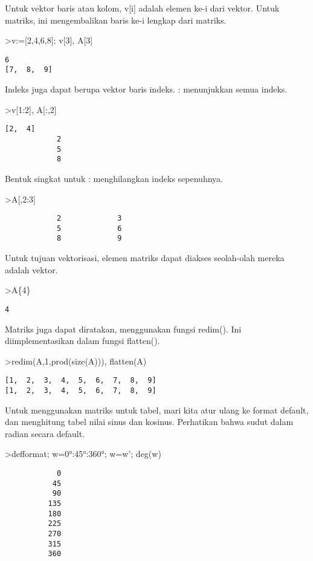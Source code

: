 \documentclass[
]{book}
\begin{document}
Untuk vektor baris atau kolom, v{[}i{]} adalah elemen ke-i dari vektor. Untuk matriks, ini mengembalikan baris ke-i lengkap dari matriks.

\textgreater v:={[}2,4,6,8{]}; v{[}3{]}, A{[}3{]}

\begin{verbatim}
6
[7,  8,  9]
\end{verbatim}

Indeks juga dapat berupa vektor baris indeks. : menunjukkan semua indeks.

\textgreater v{[}1:2{]}, A{[}:,2{]}

\begin{verbatim}
[2,  4]
            2 
            5 
            8 
\end{verbatim}

Bentuk singkat untuk : menghilangkan indeks sepenuhnya.

\textgreater A{[},2:3{]}

\begin{verbatim}
            2             3 
            5             6 
            8             9 
\end{verbatim}

Untuk tujuan vektorisasi, elemen matriks dapat diakses seolah-olah mereka adalah vektor.

\textgreater A\{4\}

\begin{verbatim}
4
\end{verbatim}

Matriks juga dapat diratakan, menggunakan fungsi redim(). Ini diimplementasikan dalam fungsi flatten().

\textgreater redim(A,1,prod(size(A))), flatten(A)

\begin{verbatim}
[1,  2,  3,  4,  5,  6,  7,  8,  9]
[1,  2,  3,  4,  5,  6,  7,  8,  9]
\end{verbatim}

Untuk menggunakan matriks untuk tabel, mari kita atur ulang ke format default, dan menghitung tabel nilai sinus dan kosinus. Perhatikan bahwa sudut dalam radian secara default.

\textgreater defformat; w=0°:45°:360°; w=w'; deg(w)

\begin{verbatim}
            0 
           45 
           90 
          135 
          180 
          225 
          270 
          315 
          360 
\end{verbatim}
\end{document}
